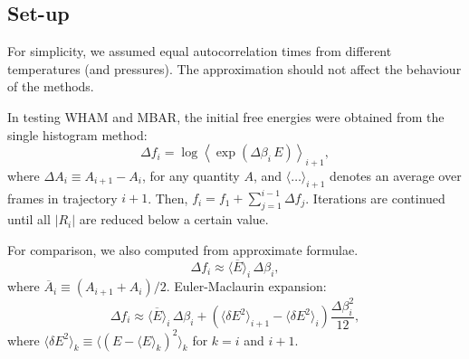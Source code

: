 \documentclass{gMOS2e}
\begin{document}
\subsection{\label{sec:results_setup}
Set-up}



For simplicity,
we assumed equal autocorrelation times
from different temperatures (and pressures).
%
The approximation should not affect
the  behaviour of the methods.



In testing WHAM and MBAR,
the initial free energies were obtained from
the single histogram method:
%
\begin{equation*}
\Delta f_i
=
\log
\left\langle
  \exp\left(
    \Delta \beta_i \, E
  \right)
\right\rangle_{i+1},
\end{equation*}
%
where $\Delta A_i \equiv A_{i+1} - A_i$,
for any quantity $A$,
and
$\langle\dots\rangle_{i + 1}$
denotes an average over frames in trajectory $i + 1$.
%
Then, $f_i = f_1 + \sum_{j = 1}^{i - 1} \Delta f_j$.
%
%
Iterations are continued
until all $|R_i|$ are reduced
below a certain value.



For comparison,
we also computed 
from  approximate formulae.
%
\cite{park2007}
%
\begin{equation}
\Delta f_i
\approx
\overline{ \langle E \rangle }_i \, \Delta \beta_i,
\label{eq:df_eav}
\end{equation}
where
$\overline{ A }_i \equiv (A_{i+1} + A_i)/2$.
%
Euler-Maclaurin expansion\cite{
arfken, abramowitz, wang_specfunc, whittaker}:
%
\begin{equation}
\Delta f_i
\approx
\overline{ \langle E \rangle }_i \, \Delta \beta_i
+
\left(
  \langle \delta E^2 \rangle_{i+1}
-
  \langle \delta E^2 \rangle_i
\right)
\frac{ \Delta \beta_i^2 }{ 12 },
\label{eq:df_eavb}
\end{equation}
%
where
$\langle \delta E^2 \rangle_k
\equiv \langle (E - \langle E \rangle_k)^2 \rangle_k$
for $k = i$ and $i + 1$.
%
\end{document}
